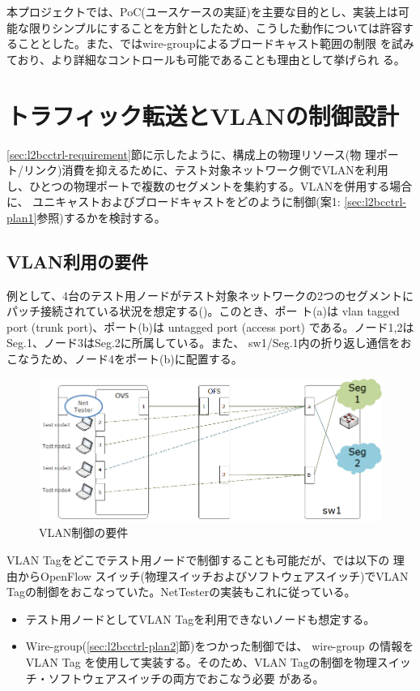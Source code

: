 本プロジェクトでは、PoC(ユースケースの実証)を主要な目的とし、実装上は可
能な限りシンプルにすることを方針としたため、こうした動作については許容す
ることとした。また、\lopj ではwire-groupによるブロードキャスト範囲の制限
を試みており、より詳細なコントロールも可能であることも理由として挙げられ
る。


 \section{トラフィック転送とVLANの制御設計}
 \label{sec:vlan-ctrl}

\ref{sec:l2bcctrl-requirement}節に示したように、構成上の物理リソース(物
理ポート/リンク)消費を抑えるために、テスト対象ネットワーク側でVLANを利用
し、ひとつの物理ポートで複数のセグメントを集約する。VLANを併用する場合に、
ユニキャストおよびブロードキャストをどのように制御(案1:
\ref{sec:l2bcctrl-plan1}参照)するかを検討する。

  \subsection{VLAN利用の要件}
  \label{sec:vlan-ctrl-req}

例として、4台のテスト用ノードがテスト対象ネットワークの2つのセグメントに
パッチ接続されている状況を想定する()。このとき、ポー
ト(a)は vlan tagged port (trunk port)、ポート(b)は untagged port (access
port) である。ノード1,2はSeg.1、ノード3はSeg.2に所属している。また、
sw1/Seg.1内の折り返し通信をおこなうため、ノード4をポート(b)に配置する。

\begin{figure}[h]
 \centering
 \includegraphics[scale=0.6]{img/vlan-req.png}
 \caption{VLAN制御の要件}
 \label{fig:vlan-req}
\end{figure}

VLAN Tagをどこでテスト用ノードで制御することも可能だが、\lopj では以下の
理由からOpenFlow スイッチ(物理スイッチおよびソフトウェアスイッチ)でVLAN
Tagの制御をおこなっていた。NetTesterの実装もこれに従っている。
\begin{itemize}
 \item テスト用ノードとしてVLAN Tagを利用できないノードも想定する。
 \item Wire-group(\ref{sec:l2bcctrl-plan2}節)をつかった制御では、
       wire-group の情報をVLAN Tag を使用して実装する。そのため、VLAN
       Tagの制御を物理スイッチ・ソフトウェアスイッチの両方でおこなう必要
       がある。
\end{itemize}

